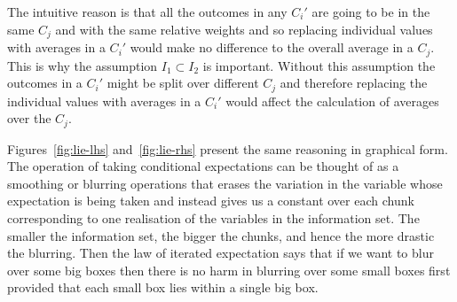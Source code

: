 \documentclass[11pt,reqno,openany]{amsbook}
\theoremstyle{plain}
\theoremstyle{definition}
\begin{document}
The intuitive reason is that all the outcomes in any $C_i'$ are going to
be in the same $C_j$ and with the same relative weights and so
replacing individual values with averages in a $C_i'$ would make no
difference to the overall average in a $C_j$. This is why the
assumption $I_1 \subset I_2$ is important. Without this assumption
the outcomes in a $C_i'$ might be split over different $C_j$ and
therefore replacing the individual values with averages in a $C_i'$
would affect the calculation of averages over the $C_j$.

Figures~\ref{fig:lie-lhs} and~\ref{fig:lie-rhs} present the same reasoning in
graphical form. The operation of taking conditional expectations can
be thought of as a smoothing or blurring operations that erases the
variation in the variable whose expectation is being taken and instead
gives
us a constant over each chunk corresponding to
one realisation of the variables in the information set. The smaller
the information set, the bigger the chunks, and hence the more drastic
the blurring. Then the law of iterated expectation says that if we
want to blur over some big boxes then there is no harm in blurring over
some small boxes first provided that each small box lies within a
single big box.
\end{document}
